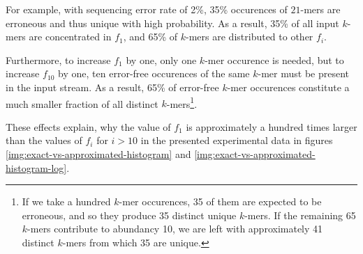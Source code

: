 For example, with sequencing error rate of 2\%, 35\% occurences of $21$-mers are erroneous and thus
unique with high probability. As a result, 35\% of all input $k$-mers are concentrated in $f_1$, and
65\% of $k$-mers are distributed to other $f_i$. 

Furthermore, to increase $f_1$ by one, only one $k$-mer occurence is needed, but to increase
$f_{10}$ by one, ten error-free occurences of the same $k$-mer must be present in the input stream. 
As a result, 65\% of error-free $k$-mer occurences constitute a much smaller fraction of all 
distinct $k$-mers\footnote{If we take a hundred $k$-mer occurences, 35 of them are expected
to be erroneous, and so they produce 35 distinct unique $k$-mers. If the remaining 65 $k$-mers 
contribute to abundancy 10, we are left with approximately 41 distinct $k$-mers from which 
35 are unique.}.

These effects explain, why the value of $f_1$ is approximately a hundred times larger than
the values of $f_i$ for $i>10$ in the presented experimental data in figures
\ref{img:exact-vs-approximated-histogram} and \ref{img:exact-vs-approximated-histogram-log}.
